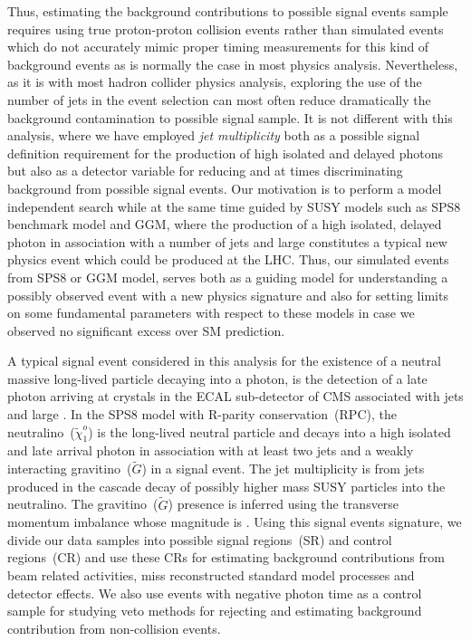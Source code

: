 Thus, estimating the background  contributions to possible signal events sample requires using true proton-proton collision events rather than simulated events which do not accurately mimic proper timing measurements for this kind of background events as is normally the case in most physics  analysis. 
Nevertheless, as it is with most hadron collider physics analysis, exploring the use of the number of jets in the event selection can most often reduce dramatically the background contamination to possible signal sample. It is not different with this analysis, where we have employed \textit{jet multiplicity} both as a possible signal definition requirement for the production of high \pt isolated and delayed photons but also as a detector variable for reducing and at times discriminating  background from possible signal events.
Our motivation is to perform a model independent search while at the same time guided by SUSY models such as SPS8 benchmark model and GGM, where the production of a high \pt isolated, delayed photon in association  with a number of jets and large \MET constitutes a typical new physics event  which could be produced at the LHC.
Thus, our simulated events from SPS8 or GGM model, serves both as a guiding model for  understanding a possibly observed event with a new physics signature and also for setting  limits on some fundamental parameters with respect to these models in case we observed no significant excess over SM prediction.

A typical signal event considered in this analysis for the existence of a neutral massive long-lived particle decaying into a photon, is the detection of a late photon arriving at crystals in the ECAL sub-detector of CMS associated with jets and large \MET . In the SPS8 model with R-parity conservation~(RPC), the neutralino~($\tilde{\chi}^{o}_{1}$) is the long-lived neutral particle and decays into a high \pt isolated and late arrival photon in association with at least two jets and a weakly interacting gravitino~($\tilde{G}$) in a signal event. The jet multiplicity is from jets produced in the cascade decay of possibly higher mass SUSY particles into the neutralino. The gravitino~($\tilde{G}$) presence is inferred using the transverse momentum imbalance whose magnitude is \MET .
Using this signal events signature, we divide our data samples into possible signal regions~(SR) and control regions~(CR) and use these CRs for estimating background contributions  from beam related activities, miss reconstructed standard model processes and detector effects. We also use events with negative photon time as a control sample for studying veto methods for rejecting and estimating background contribution from non-collision events.
